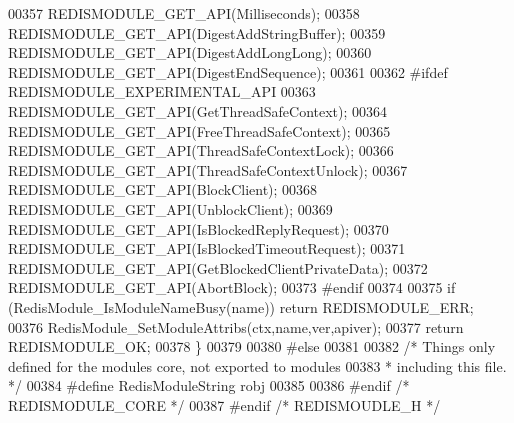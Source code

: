 \begin{DoxyCode}
00357     REDISMODULE\_GET\_API(Milliseconds);
00358     REDISMODULE\_GET\_API(DigestAddStringBuffer);
00359     REDISMODULE\_GET\_API(DigestAddLongLong);
00360     REDISMODULE\_GET\_API(DigestEndSequence);
00361 
00362 \textcolor{preprocessor}{#}\textcolor{preprocessor}{ifdef} \textcolor{preprocessor}{REDISMODULE\_EXPERIMENTAL\_API}
00363     REDISMODULE\_GET\_API(GetThreadSafeContext);
00364     REDISMODULE\_GET\_API(FreeThreadSafeContext);
00365     REDISMODULE\_GET\_API(ThreadSafeContextLock);
00366     REDISMODULE\_GET\_API(ThreadSafeContextUnlock);
00367     REDISMODULE\_GET\_API(BlockClient);
00368     REDISMODULE\_GET\_API(UnblockClient);
00369     REDISMODULE\_GET\_API(IsBlockedReplyRequest);
00370     REDISMODULE\_GET\_API(IsBlockedTimeoutRequest);
00371     REDISMODULE\_GET\_API(GetBlockedClientPrivateData);
00372     REDISMODULE\_GET\_API(AbortBlock);
00373 \textcolor{preprocessor}{#}\textcolor{preprocessor}{endif}
00374 
00375     \textcolor{keywordflow}{if} (RedisModule\_IsModuleNameBusy(name)) \textcolor{keywordflow}{return} REDISMODULE\_ERR;
00376     RedisModule\_SetModuleAttribs(ctx,name,ver,apiver);
00377     \textcolor{keywordflow}{return} REDISMODULE\_OK;
00378 \}
00379 
00380 \textcolor{preprocessor}{#}\textcolor{preprocessor}{else}
00381 
00382 \textcolor{comment}{/* Things only defined for the modules core, not exported to modules}
00383 \textcolor{comment}{ * including this file. */}
00384 \textcolor{preprocessor}{#}\textcolor{preprocessor}{define} \textcolor{preprocessor}{RedisModuleString} \textcolor{preprocessor}{robj}
00385 
00386 \textcolor{preprocessor}{#}\textcolor{preprocessor}{endif} \textcolor{comment}{/* REDISMODULE\_CORE */}
00387 \textcolor{preprocessor}{#}\textcolor{preprocessor}{endif} \textcolor{comment}{/* REDISMOUDLE\_H */}
\end{DoxyCode}
